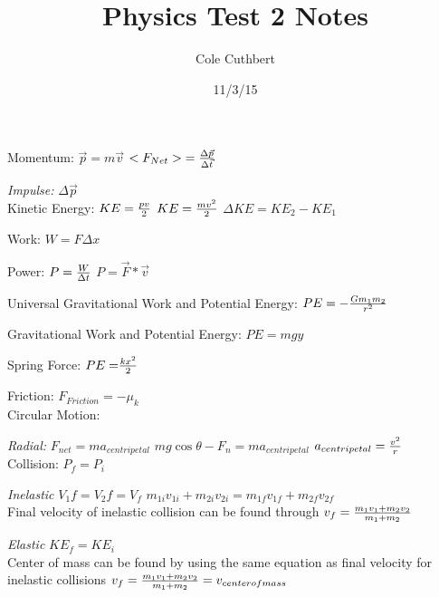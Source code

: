 \documentclass[11pt, oneside]{article}   	%
\title{Physics Test 2 Notes}
\author{Cole Cuthbert}
\date{11/3/15}
\begin{document}
\maketitle

Momentum: \hspace{.5cm} ${\vec{p}=m\vec{v}}$ \hspace{.5cm} ${<F_{Net}>}={\Delta\vec{p}\over\Delta\vec{t}}$\

\hspace{.5cm}\emph{Impulse:} \hspace{.5cm} $\Delta\vec{p}$\\

Kinetic Energy: \hspace{.5cm} $KE={pv\over2}$ \hspace{.5cm} $KE={mv^2\over2}$\hspace{.5cm} $\Delta KE=KE_2-KE_1$\

Work: \hspace{.5cm} ${W}={F\Delta x}$\

Power: \hspace{.5cm} $P={W\over\Delta t}$ \hspace{.5cm} $P=\vec{F}*\vec{v}$\

Universal Gravitational Work and Potential Energy: \hspace{.5cm} $PE=-{{Gm_1m_2}\over{r^2}}$\

Gravitational Work and Potential Energy: \hspace{.5cm} $PE=mgy$\

Spring Force: \hspace{.5cm} ${PE=}{{kx^2} \over 2}$ \

Friction: \hspace{.5cm} $F_{Friction}=-\mu_k$\\

Circular Motion:\

\hspace{.25cm}\emph{Radial:} \hspace{.5cm} $F_{net}=ma_{centripetal}$ \hspace{1cm} $mg\cos\theta-F_n=ma_{centripetal}$ \hspace{1cm} $a_{centripetal}={v^2\over r}$\\

Collision: \hspace{.5cm} $P_f=P_i$\

\hspace{.25cm}\emph{Inelastic} \hspace{.5cm} $V_1f=V_2f=V_f$ \hspace{1cm} $m_{1i}v_{1i}+m_{2i}v_{2i}=m_{1f}v_{1f}+m_{2f}v_{2f}$\\
Final velocity of inelastic collision can be found through ${v_f={{m_1v_1+m_2v_2}\over{m_1+m_2}}}$\

\hspace{.25cm}\emph{Elastic} \hspace{.5cm} $KE_f=KE_i$\\
Center of mass can be found by using the same equation as final velocity for inelastic collisions ${v_f={{m_1v_1+m_2v_2}\over{m_1+m_2}}=v_{center of mass}}$
\end{document}
